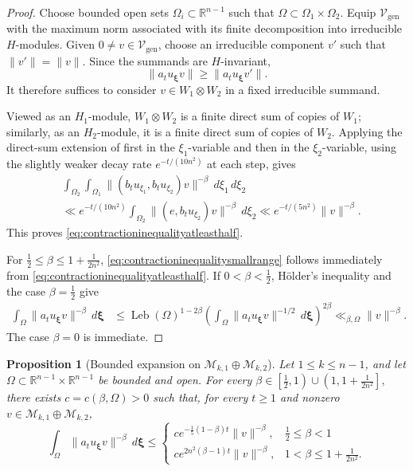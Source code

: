 \documentclass[reqno,11pt]{amsart}
\numberwithin{equation}{section}
\newtheorem{proposition}[theorem]{Proposition}
\theoremstyle{definition}
\theoremstyle{remark}
\newcommand{\op}{\operatorname}
\newcommand{\Leb}{\op{Leb}}
\begin{document}
\begin{proof}
Choose bounded open sets
$\Omega_i\subset\mathbb R^{n-1}$ such that
$\Omega\subset\Omega_1\times\Omega_2$. Equip
$\mathcal V_{\op{gen}}$ with the maximum norm associated with its finite
decomposition into irreducible $H$-modules. Given $0\ne v\in
\mathcal V_{\op{gen}}$, choose an irreducible component $v'$ such that
$\|v'\|=\|v\|$. Since the summands are $H$-invariant,
$$
\|a_tu_{\boldsymbol{\xi}}v\|
\ge\|a_tu_{\boldsymbol{\xi}}v'\|.
$$
It therefore suffices to consider
$v\in W_1\otimes W_2$ in a fixed irreducible summand.

Viewed as an $H_1$-module, $W_1\otimes W_2$ is a finite direct sum of
copies of $W_1$; similarly, as an $H_2$-module, it is a finite direct
sum of copies of $W_2$. Applying the direct-sum extension of
 first in the $\xi_1$-variable
and then in the $\xi_2$-variable, using the slightly weaker decay rate
$e^{-t/(10n^2)}$ at each step, gives
$$
\begin{aligned}
&\int_{\Omega_2}\int_{\Omega_1}
 \|(b_tu_{\xi_1},b_tu_{\xi_2})v\|^{-\beta}
 \,d\xi_1\,d\xi_2\\
& \ll
e^{-t/(10n^2)}
\int_{\Omega_2}\|(e,b_tu_{\xi_2})v\|^{-\beta}\,d\xi_2 \ll
e^{-t/(5n^2)}\|v\|^{-\beta}.
\end{aligned}
$$
This proves \eqref{eq:contractioninequalityatleasthalf}.

For $\frac12\le\beta\le1+\frac1{2n^2}$,
\eqref{eq:contractioninequalitysmallrange} follows immediately from
\eqref{eq:contractioninequalityatleasthalf}. If
$0<\beta<\frac12$, H\"older's inequality and the case $\beta=\frac12$
give
$$
\begin{aligned}
\int_\Omega\|a_tu_{\boldsymbol{\xi}}v\|^{-\beta}
\,d\boldsymbol{\xi}
&\le
\Leb(\Omega)^{1-2\beta}
\left(
\int_\Omega\|a_tu_{\boldsymbol{\xi}}v\|^{-1/2}
\,d\boldsymbol{\xi}
\right)^{2\beta} \ll_{\beta,\Omega}\|v\|^{-\beta}.
\end{aligned}
$$
The case $\beta=0$ is immediate.
\end{proof}

\begin{proposition}
[Bounded expansion on $\mathcal M_{k,1}\oplus\mathcal M_{k,2}$]
\label{lem:boundedexpansionfornn-1}
Let $1\le k\le n-1$, and let
$\Omega\subset\mathbb R^{n-1}\times\mathbb R^{n-1}$ be bounded and
open. For every
$
\beta\in
\left[\frac12,1\right)
\cup
\left(1,1+\frac1{2n^2}\right],
$
there exists $c=c(\beta,\Omega)>0$ such that, for every $t\ge1$ and
nonzero
$v\in\mathcal M_{k,1}\oplus\mathcal M_{k,2}$,
$$
\int_\Omega\|a_tu_{\boldsymbol{\xi}} v\|^{-\beta}\,d\boldsymbol{\xi}
\le
\begin{cases}
c e^{-\frac15(1-\beta)t}\|v\|^{-\beta},
&\frac12\le\beta<1\\ 
c e^{2n^2(\beta-1)t}\|v\|^{-\beta},
&1<\beta\le1+\frac1{2n^2}.
\end{cases}
$$ \end{proposition}
\end{document}
